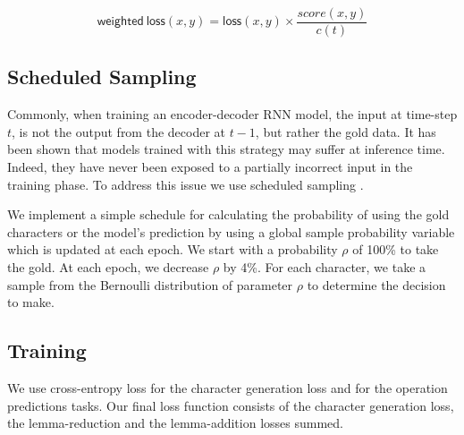 \documentclass[11pt,a4paper]{article}
\newcommand\jp[1]{\textbf{JP: #1}}
\begin{document}
\begin{equation}
\mathsf{weighted\ loss}(x, y) = \mathsf{loss}(x, y) \times \frac{score(x, y)}{c(t)}
\end{equation}





\subsection{Scheduled Sampling}

Commonly, when training an encoder-decoder RNN model, the input at
time-step $t$, is not the output from the decoder at $t-1$, but rather
the gold data.  It has been shown that models trained with this
strategy may suffer at inference time. Indeed, they have never been
exposed to a partially incorrect input in the training phase.  To
address this issue we use scheduled sampling
\cite{DBLP:conf/nips/BengioVJS15}.

We implement a simple schedule for calculating the probability of
using the gold characters or the model's prediction by using a global
sample probability variable which is updated at each epoch. We start
with a probability \(\rho\) of 100\% to take the gold. At each epoch,
we decrease \(\rho\) by 4\%. For each character, we take a sample from
the Bernoulli distribution of parameter \(\rho\) to determine the
decision to make.

\subsection{Training}

We use cross-entropy loss for the character generation loss and 
for the operation predictions tasks. Our final loss function consists
of the character generation loss, the lemma-reduction and the
lemma-addition losses summed.
\end{document}
